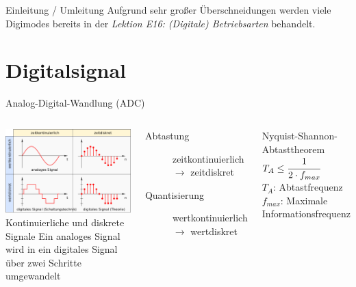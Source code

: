 

\subtitle{Technik A15: \\
           Übertragungstechnik \\[2em]}
\date{Stand 07.03.2016}


\begin{frame}{Einleitung / Umleitung}
  Aufgrund sehr großer Überschneidungen werden viele Digimodes bereits in der \emph{Lektion E16: (Digitale) Betriebsarten} behandelt.
\end{frame}

\section{Digitalsignal}
\begin{frame}{Analog-Digital-Wandlung (ADC)}
  \begin{columns}
    \includegraphics[width=\textwidth,height=.8\textheight,keepaspectratio]{a15/Uebersicht_kontinuierliche_und_diskrete_Signale.png}\\
    {\tiny Kontinuierliche und diskrete Signale \hyperlink{refs}{\cite{wm}}}
    Ein analoges Signal wird in ein digitales Signal über zwei Schritte umgewandelt
    \begin{description}
      \item[Abtastung] zeitkontinuierlich $\rightarrow$ zeitdiskret
      \item[Quantisierung] wertkontinuierlich $\rightarrow$ wertdiskret
    \end{description}
    \begin{block}{Nyquist-Shannon-Abtasttheorem}
      $T_A \leq \cfrac{1}{2 \cdot f_{max}}$\\[.5em]
      $T_A$: Abtastfrequenz\\
      $f_{max}$: Maximale Informationsfrequenz
    \end{block}
  \end{columns}
\end{frame}

